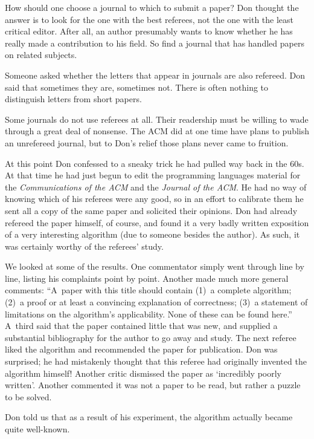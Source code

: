 How should one choose a journal to which to submit a paper? Don
thought the answer is to look for the one with the best referees, not
the one with the least critical editor. After all, an author
presumably wants to know whether he has really made a contribution to
his field.  So find a journal that has handled papers on related
subjects.

Someone asked whether the letters that appear in journals are also
refereed. Don said that sometimes they are, sometimes not. There is
often nothing to distinguish letters from short papers.

Some journals do not use referees at all. Their readership must be
willing to wade through a great deal of nonsense. The ACM did at one
time have plans to publish an unrefereed journal, but to Don's relief those plans
never came to fruition.

At this point Don confessed to a sneaky trick he had pulled way back
in the 60s. At that time he had just begun to edit
 the programming languages
material for the {\sl Communications of the ACM\/} and the {\sl Journal 
of the ACM}.
He had no way of knowing which of his referees were any good, so
in an effort to calibrate them he sent all a copy of the same paper
and solicited their opinions. Don had already refereed the paper
himself, of course, and found it a very badly written exposition of a
very interesting algorithm (due to someone besides the author).
 As such, it was certainly worthy of the
referees' study. 

We looked at some of the results.
One commentator simply went through line by line, listing his
complaints point by point. Another made much more general comments:
``A~paper with this title should contain (1)~a complete
algorithm; (2)~a proof or at least a convincing explanation of
correctness; (3)~a statement of limitations on the algorithm's
applicability. None of these can be found here.''
A~third said that the paper contained little
that was new, and supplied a substantial bibliography for the author
to go away and study.  The next referee liked the algorithm and
recommended the paper for publication. Don was  surprised; he
had mistakenly 
thought that this referee had originally invented the algorithm
himself! Another critic dismissed the paper as `incredibly poorly written'.
Another commented it was not a paper to be read, but rather
a puzzle to be solved.

Don told us that as a result of his experiment, the algorithm actually
became quite well-known.

